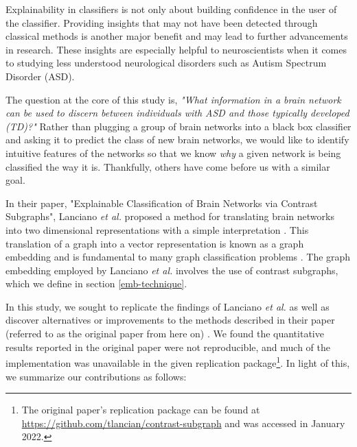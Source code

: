 \documentclass[sigconf]{acmart}
\begin{document}
Explainability in classifiers is not only about building confidence in the user of the classifier.
Providing insights that may not have been detected through classical methods is another major benefit and may lead to further advancements in research.
These insights are especially helpful to neuroscientists when it comes to studying less understood neurological disorders such as Autism Spectrum Disorder (ASD).

The question at the core of this study is, \emph{"What information in a brain network can be used to discern between individuals with ASD and those typically developed (TD)?"}
Rather than plugging a group of brain networks into a black box classifier and asking it to predict the class of new brain networks, we would like to identify intuitive features of the networks so that we know \emph{why} a given network is being classified the way it is.
Thankfully, others have come before us with a similar goal.

In their paper, "Explainable Classification of Brain Networks via Contrast Subgraphs", Lanciano \emph{et al.} proposed a method for translating brain networks into two dimensional representations with a simple interpretation \cite{lanciano2020}.
This translation of a graph into a vector representation is known as a graph embedding and is fundamental to many graph classification problems \cite{goyal2018}.
The graph embedding employed by Lanciano \emph{et al.} involves the use of contrast subgraphs, which we define in section \ref{emb-technique}.

In this study, we sought to replicate the findings of Lanciano \emph{et al.} as well as discover alternatives or improvements to the methods described in their paper (referred to as the original paper from here on) \cite{lanciano2020}.
We found the quantitative results reported in the original paper were not reproducible, and much of the implementation was unavailable in the given replication package\footnote{The original paper's replication package can be found at \url{https://github.com/tlancian/contrast-subgraph} and was accessed in January 2022.}.
In light of this, we summarize our contributions as follows:
\end{document}

